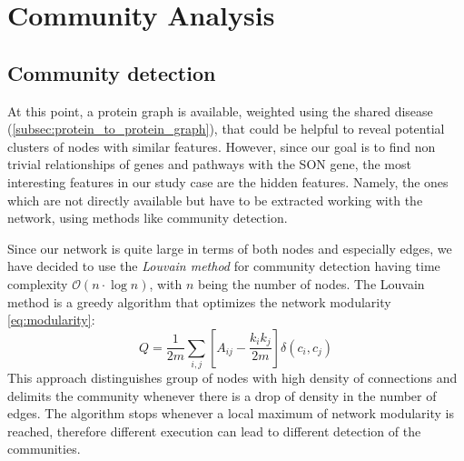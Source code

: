 \section{Community Analysis}\label{sec:community_analysis}
\subsection{Community detection}\label{subsec:community_detection}
At this point, a protein graph is available, weighted using the shared disease (\autoref{subsec:protein_to_protein_graph}), that could be helpful to reveal potential clusters of nodes with similar features. However, since our goal is to find non trivial relationships of genes and pathways with the SON gene, the most interesting features in our study case are the hidden features. Namely, the ones which are not directly available but have to be extracted working with the network, using methods like community detection.
\vspace{3mm}

Since our network is quite large in terms of both nodes and especially edges, we have decided to use the \textit{Louvain method} for community detection having time complexity $\mathcal{O}(n \cdot \log{n})$, with $n$ being the number of nodes. The Louvain method is a greedy algorithm that optimizes the network modularity \eqref{eq:modularity}:
\begin{equation}
    Q = \frac{1}{2m} \sum_{i,j}\left[ A_{ij} - \frac{k_i k_j}{2m} \right] \delta(c_i, c_j)
    \label{eq:modularity}
\end{equation}
This approach distinguishes group of nodes with high density of connections and delimits the community whenever there is a drop of density in the number of edges. The algorithm stops whenever a local maximum of network modularity is reached, therefore different execution can lead to different detection of the communities.
\vspace{3mm}

